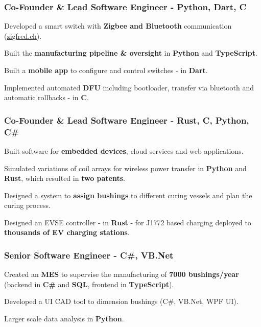 \begin{timeline}
    \subsubsection{Co-Founder \& Lead Software Engineer - Python, Dart, C}
    Developed a smart switch with \textbf{Zigbee and Bluetooth} communication (\href{https://zigfred.ch}{zigfred.ch}).
    \begin{tightemize}
        \item Built the \textbf{manufacturing pipeline \& oversight} in \textbf{Python} and \textbf{TypeScript}.
        \item Built a \textbf{mobile app} to configure and control switches - in \textbf{Dart}. 
        \item Implemented automated \textbf{DFU} including bootloader, transfer via bluetooth and automatic rollbacks - in \textbf{C}.
    \end{tightemize}
    \sectionsep
    
    \subsubsection{Co-Founder \& Lead Software Engineer - Rust, C, Python, C\#}
    Built software for \textbf{embedded devices}, cloud services and web applications.
    \begin{tightemize}
        \item Simulated variations of coil arrays for wireless power transfer in \textbf{Python} and \textbf{Rust}, which resulted in \textbf{two patents}.
        \item Designed a system to \textbf{assign bushings} to different curing vessels and plan the curing process.
        \item Designed an EVSE controller - in \textbf{Rust} - for J1772 based charging deployed to \textbf{thousands of EV charging stations}.
    \end{tightemize}
    \sectionsep

    \subsubsection{Senior Software Engineer - C\#, VB.Net}
    \begin{tightemize}
        \item Created an \textbf{MES} to supervise the manufacturing of \textbf{7000 bushings/year} (backend in \textbf{C\#} and \textbf{SQL}, frontend in \textbf{TypeScript}).
        \item Developed a UI CAD tool to dimension bushings (C\#, VB.Net, WPF UI).
        \item Larger scale data analysis in \textbf{Python}.
    \end{tightemize}
    \sectionsep


\end{timeline}
